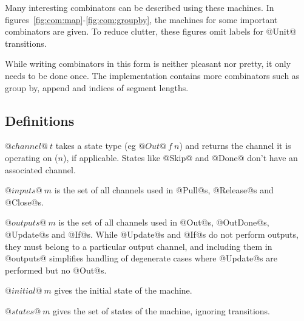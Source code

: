 Many interesting combinators can be described using these machines.
In figures~\ref{fig:com:map}-\ref{fig:com:groupby}, the machines for some important combinators are given.
To reduce clutter, these figures omit labels for @Unit@ transitions.

While writing combinators in this form is neither pleasant nor pretty, it only needs to be done once.
The implementation contains more combinators such as group by, append and indices of segment lengths.





\subsection{Definitions}

$@channel@~t$ takes a state type (eg $@Out@~f~n$) and returns the channel it is operating on ($n$), if applicable.
States like @Skip@ and @Done@ don't have an associated channel.

$@inputs@~m$ is the set of all channels used in @Pull@s, @Release@s and @Close@s.

$@outputs@~m$ is the set of all channels used in @Out@s, @OutDone@s, @Update@s and @If@s.
While @Update@s and @If@s do not perform outputs, they must belong to a particular output channel, and including them in @outputs@ simplifies handling of degenerate cases where @Update@s are performed but no @Out@s.

$@initial@~m$ gives the initial state of the machine.

$@states@~m$ gives the set of states of the machine, ignoring transitions.


